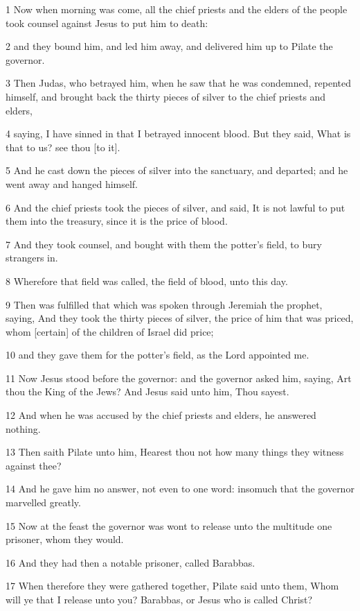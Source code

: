 \par 1 Now when morning was come, all the chief priests and the elders of the people took counsel against Jesus to put him to death:
\par 2 and they bound him, and led him away, and delivered him up to Pilate the governor.
\par 3 Then Judas, who betrayed him, when he saw that he was condemned, repented himself, and brought back the thirty pieces of silver to the chief priests and elders,
\par 4 saying, I have sinned in that I betrayed innocent blood. But they said, What is that to us? see thou [to it].
\par 5 And he cast down the pieces of silver into the sanctuary, and departed; and he went away and hanged himself.
\par 6 And the chief priests took the pieces of silver, and said, It is not lawful to put them into the treasury, since it is the price of blood.
\par 7 And they took counsel, and bought with them the potter's field, to bury strangers in.
\par 8 Wherefore that field was called, the field of blood, unto this day.
\par 9 Then was fulfilled that which was spoken through Jeremiah the prophet, saying, And they took the thirty pieces of silver, the price of him that was priced, whom [certain] of the children of Israel did price;
\par 10 and they gave them for the potter's field, as the Lord appointed me.
\par 11 Now Jesus stood before the governor: and the governor asked him, saying, Art thou the King of the Jews? And Jesus said unto him, Thou sayest.
\par 12 And when he was accused by the chief priests and elders, he answered nothing.
\par 13 Then saith Pilate unto him, Hearest thou not how many things they witness against thee?
\par 14 And he gave him no answer, not even to one word: insomuch that the governor marvelled greatly.
\par 15 Now at the feast the governor was wont to release unto the multitude one prisoner, whom they would.
\par 16 And they had then a notable prisoner, called Barabbas.
\par 17 When therefore they were gathered together, Pilate said unto them, Whom will ye that I release unto you? Barabbas, or Jesus who is called Christ?

